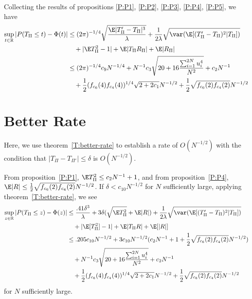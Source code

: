 Collecting the results of propositions \ref{P:P1}, \ref{P:P2}, \ref{P:P3}, \ref{P:P4}, \ref{P:P5},
we have
\begin{equation*}
  \begin{split}
    \sup_{t \in \mathbb{R}} |P(T_{\Pi} \leq t) - \Phi(t)|
    &\leq (2\pi)^{-1/4} \sqrt{\frac{\E |T_{\Pi}'-T_{\Pi}|^3}{\lambda}}
    + \frac{1}{2\lambda} \sqrt{\var (\E [(T_{\Pi}'-T_{\Pi})^2|T_{\Pi}])} \\
    &\quad + |\E T_{\Pi}^2 - 1| + \E |T_{\Pi}R_{\Pi}| + \E |R_{\Pi}| \\
    &\leq  (2\pi)^{-1/4} c_9 N^{-1/4} + 
    N^{-1} c_3\sqrt{20 + 16\frac{\sum_{i=1}^{2N} u_{i}^4}{N^2}} + c_2 N^{-1} \\
    &\quad + \frac{1}{2}(f_{c_6}(4)f_{c_4}(4))^{1/4} \sqrt{2+2c_1} N^{-1/2} +
    \frac{1}{2}\sqrt{f_{c_6}(2)f_{c_4}(2)} N^{-1/2}
  \end{split}
\end{equation*}

\section{Better Rate}
Here, we use theorem~\ref{T:better-rate} to establish a rate of $O(N^{-1/2})$ with the condition that 
$|T_{\Pi}-T_{\Pi'}| \leq \delta$ is $O(N^{-1/2})$.

From proposition~\ref{P:P1}, $\E T_{\Pi}^2 \leq c_2 N^{-1} + 1$, and from proposition~\ref{P:P4},
$\E|R| \leq \frac{1}{2}\sqrt{f_{c_6}(2)f_{c_4}(2)} N^{-1/2}$.  If $\delta < c_{10} N^{-1/2}$ for 
$N$ sufficiently large, applying theorem~\ref{T:better-rate}, we see 
\begin{equation*}
  \begin{split}
    \sup_{z \in \mathbb{R}} |P(T_{\Pi} \leq z) - \Phi(z)|
    &\leq \frac{.41 \delta^3}{\lambda} + 3 \delta (\sqrt{\E T_{\Pi}^2} + \E |R|)
    + \frac{1}{2\lambda} \sqrt{\var (\E [(T_{\Pi}'-T_{\Pi})^2|T_{\Pi}])} \\
    &\quad + |\E [T_{\Pi}^2] - 1| + \E |T_{\Pi} R| + \E [|R|] \\
    &\leq .205 c_{10} N^{-1/2} + 3c_{10} N^{-1/2} (c_2 N^{-1} + 1 + \frac{1}{2}\sqrt{f_{c_6}(2)f_{c_4}(2)} N^{-1/2}) \\
    &\quad + N^{-1} c_3\sqrt{20 + 16\frac{\sum_{i=1}^{2N} u_{i}^4}{N^2}} + c_2 N^{-1} \\
    &\quad + \frac{1}{2}(f_{c_6}(4)f_{c_4}(4))^{1/4} \sqrt{2+2c_1} N^{-1/2} +
    \frac{1}{2}\sqrt{f_{c_6}(2)f_{c_4}(2)} N^{-1/2}
  \end{split}
\end{equation*}
for $N$ sufficiently large.
